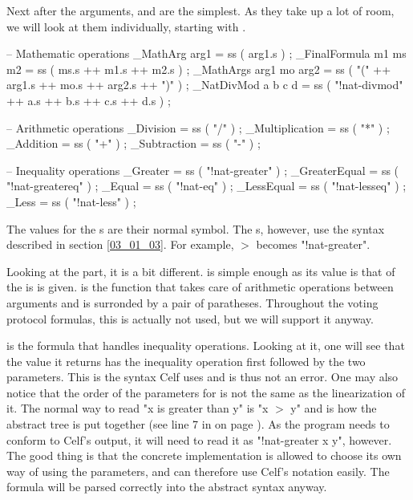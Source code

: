 Next after the arguments,  and  are the simplest. As they take up a lot of room, we will look at them individually, starting with .

\begin{lstgf}
        -- Mathematic operations
        _MathArg arg1                   = ss ( arg1.s ) ;
        _FinalFormula m1 ms m2          = ss ( ms.s ++ m1.s ++ m2.s ) ;
        _MathArgs arg1 mo arg2          = ss ( "(" ++ arg1.s ++ mo.s ++ arg2.s ++ ")" ) ;
        _NatDivMod a b c d              = ss ( "!nat-divmod" ++ a.s ++ b.s ++ c.s ++ d.s ) ;

        -- Arithmetic operations
        _Division                       = ss ( "/" ) ;
        _Multiplication                 = ss ( "*" ) ;
        _Addition                       = ss ( "+" ) ;
        _Subtraction                    = ss ( "-" ) ;

        -- Inequality operations
        _Greater                        = ss ( "!nat-greater" ) ;
        _GreaterEqual                   = ss ( "!nat-greatereq" ) ;
        _Equal                          = ss ( "!nat-eq" ) ;
        _LessEqual                      = ss ( "!nat-lesseq" ) ;
        _Less                           = ss ( "!nat-less" ) ;
\end{lstgf}
The values for the s are their normal symbol. The s, however, use the syntax described in section \ref{03_01_03}. For example, $>$ becomes "!nat-greater".

Looking at the  part, it is a bit different.  is simple enough as its value is that of the  is is given.  is the function that takes care of arithmetic operations between arguments and is surronded by a pair of paratheses. Throughout the voting protocol formulas, this is actually not used, but we will support it anyway.

 is the formula that handles inequality operations. Looking at it, one will see that the value it returns has the inequality operation first followed by the two parameters. This is the syntax Celf uses and is thus not an error. One may also notice that the order of the parameters for  is not the same as the linearization of it. The normal way to read "x is greater than y" is "x $>$ y" and is how the abstract tree is put together (see line 7 in  on page \pageref{code:04_01_C04}). As the program needs to conform to Celf's output, it will need to read it as "!nat-greater x y", however. The good thing is that the concrete implementation is allowed to choose its own way of using the parameters, and can therefore use Celf's notation easily. The formula will be parsed correctly into the abstract syntax anyway.

